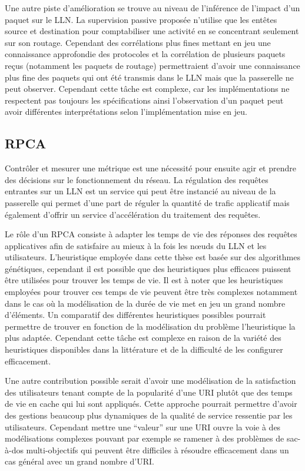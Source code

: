 Une autre piste d'amélioration se trouve au niveau de l'inférence de l'impact d'un paquet sur le \ac{LLN}.
La supervision passive proposée n'utilise que les entêtes source et destination pour comptabiliser une activité en se concentrant seulement sur son routage.
Cependant des corrélations plus fines mettant en jeu une connaissance approfondie des protocoles et la corrélation de plusieurs paquets reçus (notamment les paquets de routage) permettraient d'avoir une connaissance plus fine des paquets qui ont été transmis dans le \ac{LLN} mais que la passerelle ne peut observer.
Cependant cette tâche est complexe, car les implémentations ne respectent pas toujours les spécifications ainsi l'observation d'un paquet peut avoir différentes interprétations selon l'implémentation mise en jeu.

\subsection{\acl{RPCA}}

Contrôler et mesurer une métrique est une nécessité pour ensuite agir et prendre des décisions sur le fonctionnement du réseau.
La régulation des requêtes entrantes sur un \ac{LLN} est un service qui peut être instancié au niveau de la passerelle qui permet d'une part de réguler la quantité de trafic applicatif mais également d'offrir un service d'accélération du traitement des requêtes.

Le rôle d'un \ac{RPCA} consiste à adapter les temps de vie des réponses des requêtes applicatives afin de satisfaire au mieux à la fois les nœuds du \ac{LLN} et les utilisateurs.
L'heuristique employée dans cette thèse est basée sur des algorithmes génétiques, cependant il est possible que des heuristiques plus efficaces puissent être utilisées pour trouver les temps de vie.
Il est à noter que les heuristiques employées pour trouver ces temps de vie peuvent être très complexes notamment dans le cas où la modélisation de la durée de vie met en jeu un grand nombre d'éléments.
Un comparatif des différentes heuristiques possibles pourrait permettre de trouver en fonction de la modélisation du problème l'heuristique la plus adaptée.
Cependant cette tâche est complexe en raison de la variété des heuristiques disponibles dans la littérature et de la difficulté de les configurer efficacement.

Une autre contribution possible serait d'avoir une modélisation de la satisfaction des utilisateurs tenant compte de la popularité d'une \ac{URI} plutôt que des temps de vie en cache qui lui sont appliqués.
Cette approche pourrait permettre d'avoir des gestions beaucoup plus dynamiques de la qualité de service ressentie par les utilisateurs.
Cependant mettre une ``valeur'' sur une \ac{URI} ouvre la voie à des modélisations complexes pouvant par exemple se ramener à des problèmes de sac-à-dos multi-objectifs qui peuvent être difficiles à résoudre efficacement dans un cas général avec un grand nombre d'\ac{URI}.

